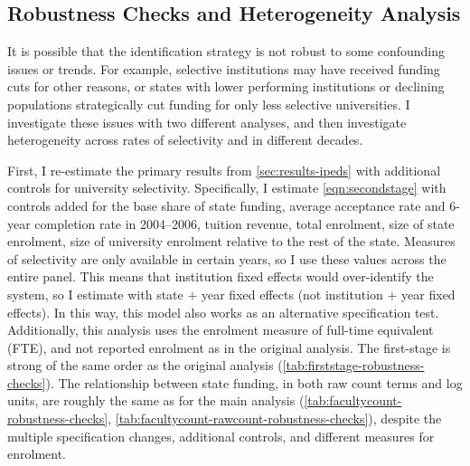 \subsection{Robustness Checks and Heterogeneity Analysis}
\label{sec:results-robustness}
It is possible that the identification strategy is not robust to some confounding issues or trends.
For example, selective institutions may have received funding cuts for other reasons, or states with lower performing institutions or declining populations strategically cut funding for only less selective universities.
I investigate these issues with two different analyses, and then investigate heterogeneity across rates of selectivity and in different decades.

First, I re-estimate the primary results from \autoref{sec:results-ipeds} with additional controls for university selectivity.
Specifically, I estimate \autoref{eqn:secondstage} with controls added for the base share of state funding, average acceptance rate and 6-year completion rate  in 2004--2006, tuition revenue, total enrolment, size of state enrolment, size of university enrolment relative to the rest of the state.
Measures of selectivity are only available in certain years, so I use these values across the entire panel.
This means that institution fixed effects would over-identify the system, so I estimate with state $+$ year fixed effects (not institution $+$ year fixed effects).
In this way, this model also works as an alternative specification test.
Additionally, this analysis uses the enrolment measure of full-time equivalent (FTE), and not reported enrolment as in the original analysis.
The first-stage is strong of the same order as the original analysis (\autoref{tab:firststage-robustness-checks}).
The relationship between state funding, in both raw count terms and log units, are roughly the same as for the main analysis (\autoref{tab:facultycount-robustness-checks}, \ref{tab:facultycount-rawcount-robustness-checks}), despite the multiple specification changes, additional controls, and different measures for enrolment.

